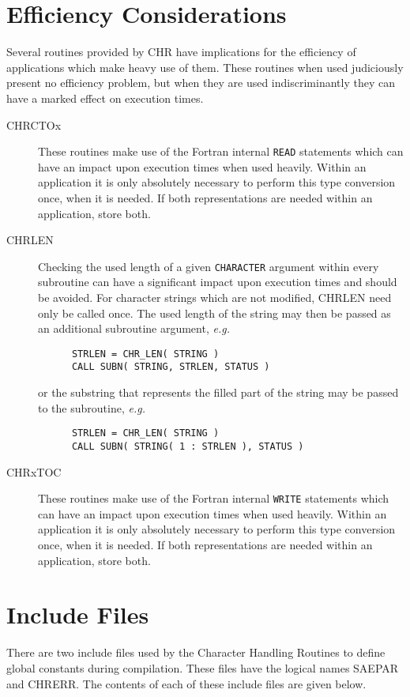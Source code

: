 \documentclass[twoside,11pt]{article}
\renewcommand{\_}{\texttt{\symbol{95}}}
\begin{document}
\section{Efficiency Considerations}
Several routines provided by CHR have implications for the efficiency of
applications which make heavy use of them.
These routines when used judiciously present no efficiency problem, but
when they are used indiscriminantly they can have a marked effect on 
execution times.

\begin {description}
\item [CHR\_CTOx] These routines make use of the Fortran internal {\tt READ}
statements which can have an impact upon execution times when used heavily.
Within an application it is only absolutely necessary to perform this type
conversion once, when it is needed.
If both representations are needed within an application, store both.
\item [CHR\_LEN] Checking the used length of a given {\tt CHARACTER} 
argument within every subroutine can have a significant impact upon execution
times and should be avoided.
For character strings which are not modified, CHR\_LEN need only be called
once.
The used length of the string may then be passed as an additional subroutine
argument, {\em e.g.}
\begin {small}
\begin{verbatim}
      STRLEN = CHR_LEN( STRING )
      CALL SUBN( STRING, STRLEN, STATUS )
\end{verbatim}
\end {small}
or the substring that represents the filled part of the string may be passed
to the subroutine, {\em e.g.}
\begin {small}
\begin{verbatim}
      STRLEN = CHR_LEN( STRING )
      CALL SUBN( STRING( 1 : STRLEN ), STATUS )
\end{verbatim}
\end {small}
\item [CHR\_xTOC] These routines make use of the Fortran internal {\tt WRITE}
statements which can have an impact upon execution times when used heavily.
Within an application it is only absolutely necessary to perform this type
conversion once, when it is needed.
If both representations are needed within an application, store both.
\end {description}


\appendix
\section {Include Files \label{incl_sect}}
There are two include files used by the Character Handling Routines
to define global constants during compilation. 
These files have the logical names SAE\_PAR and CHR\_ERR.
The contents of each of these include files are given below.
\end{document}

